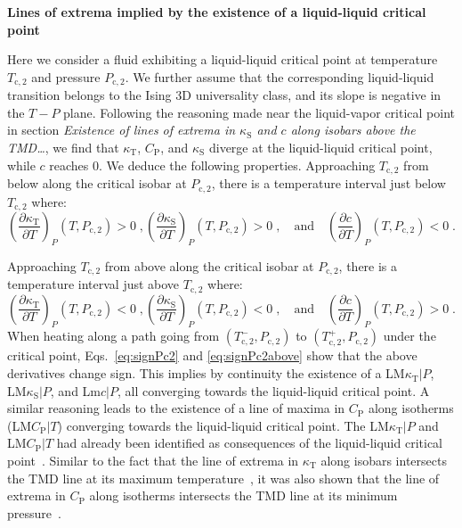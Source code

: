 \documentclass[12pt]{article}
\newcommand{\mrm}{\mathrm}
\newcommand{\kT}{\kappa_\mrm{T}}
\newcommand{\kS}{\kappa_\mrm{S}}
\newcommand{\CP}{C_\mrm{P}}
\begin{document}
\textbf{Lines of extrema implied by the existence of a liquid-liquid critical point}

Here we consider a fluid exhibiting a liquid-liquid critical point at temperature $T_\mrm{c,2}$ and pressure $P_\mrm{c,2}$. We further assume that the corresponding liquid-liquid transition belongs to the Ising 3D universality class, and its slope is negative in the $T-P$ plane. Following the reasoning made near the liquid-vapor critical point in section \textit{Existence of lines of extrema in $\kS$ and $c$ along isobars above the TMD\ldots}, we find that $\kT$, $\CP$, and $\kS$ diverge at the liquid-liquid critical point, while $c$ reaches 0. We deduce the following properties. Approaching $T_\mrm{c,2}$ from below along the critical isobar at $P_\mrm{c,2}$, there is a temperature interval just below $T_\mrm{c,2}$ where:
\begin{equation}
\left( \frac{\partial \kT}{\partial T} \right)_P (T,P_\mrm{c,2}) > 0 \; , \left( \frac{\partial \kS}{\partial T} \right)_P (T,P_\mrm{c,2}) > 0 \; , \quad\mrm{and}\quad \left( \frac{\partial c}{\partial T} \right)_P (T,P_\mrm{c,2}) < 0 \; .
\label{eq:signPc2}
\end{equation}

Approaching $T_\mrm{c,2}$ from above along the critical isobar at $P_\mrm{c,2}$, there is a temperature interval just above $T_\mrm{c,2}$ where:
\begin{equation}
\left( \frac{\partial \kT}{\partial T} \right)_P (T,P_\mrm{c,2}) < 0 \; , \left( \frac{\partial \kS}{\partial T} \right)_P (T,P_\mrm{c,2}) < 0 \; , \quad\mrm{and}\quad \left( \frac{\partial c}{\partial T} \right)_P (T,P_\mrm{c,2}) > 0 \; .
\label{eq:signPc2above}
\end{equation}
When heating along a path going from $(T_\mrm{c,2}^-,P_\mrm{c,2})$ to $(T_\mrm{c,2}^+,P_\mrm{c,2})$ under the critical point, Eqs.~\ref{eq:signPc2} and \ref{eq:signPc2above} show that the above derivatives change sign. This implies by continuity the existence of a LM$\kT|P$, LM$\kS|P$, and Lm$c|P$, all converging towards the liquid-liquid critical point. A similar reasoning leads to the existence of a line of maxima in $\CP$ along isotherms (LM$\CP|T$) converging towards the liquid-liquid critical point. The LM$\kT|P$ and LM$\CP|T$ had already been identified as consequences of the liquid-liquid critical point~\cite{Poole_phase_1992,Poole_density_2005}. Similar to the fact that the line of extrema in $\kT$ along isobars intersects the TMD line at its maximum temperature~\cite{Sastry_singularityfree_1996}, it was also shown that the line of extrema in $\CP$ along isotherms intersects the TMD line at its minimum pressure~\cite{Poole_density_2005}.\\
\end{document}
